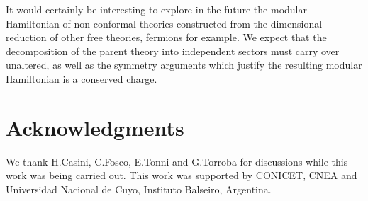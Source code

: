 \documentclass[12pt,a4paper]{article}
\begin{document}
It would certainly be interesting to explore in the future the modular Hamiltonian of non-conformal theories constructed from the dimensional reduction of other free theories, fermions for example. We expect that the decomposition of the parent theory into independent sectors must carry over unaltered, as well as the symmetry arguments which justify the resulting modular Hamiltonian is a conserved charge.



\section*{Acknowledgments}
We thank H.Casini, C.Fosco, E.Tonni and G.Torroba for discussions while this work was being carried out. This work was supported by CONICET, CNEA and Universidad Nacional de Cuyo, Instituto Balseiro, Argentina.






%


\end{document}
